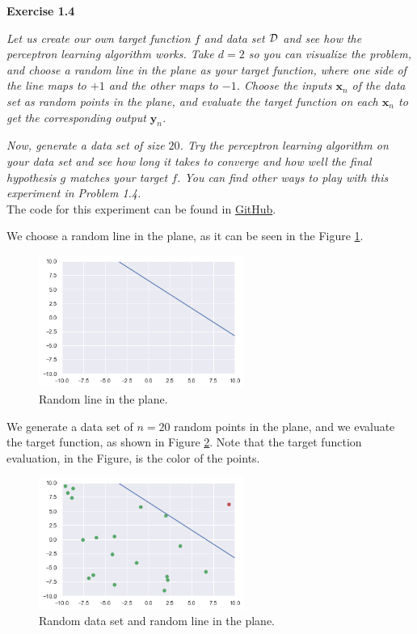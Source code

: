 \documentclass{article}
\begin{document}
    \bigskip

    \noindent \textbf{Exercise 1.4}

    \noindent \textit{Let us create our own target function $f$ and data set $\cal{D}$ and see how the perceptron learning algorithm works.
    Take $d = 2$ so you can visualize the problem, and choose a random line in the plane as your target function, where one side of the line maps to $+1$ and the other maps to $-1$.
    Choose the inputs $\mathbf{x}_n$ of the data set as random points in the plane, and evaluate the target function on each $\mathbf{x}_n$ to get the corresponding output $\mathbf{y}_n$.}

    \noindent\textit{Now, generate a data set of size $20$. Try the perceptron learning algorithm on your data set and see how long it takes to converge and how well the final hypothesis $g$ matches your target $f$.
    You can find other ways to play with this experiment in Problem 1.4.} \\

    The code for this experiment can be found in \href{https://github.com/lucasresck/machine-learning/blob/main/notebooks/exercise_1.4.ipynb}{GitHub}.

    We choose a random line in the plane, as it can be seen in the Figure \ref{fig:random_line}.
    
    \begin{figure}[H]
        \centering
        \includegraphics[width=0.6\textwidth]{exercise_1.4_1.png}
        \caption{Random line in the plane.}
        \label{fig:random_line}
    \end{figure}

    We generate a data set of $n = 20$ random points in the plane, and we evaluate the target function, as shown in Figure \ref{fig:data_set}.
    Note that the target function evaluation, in the Figure, is the color of the points.
    
    \begin{figure}[H]
        \centering
        \includegraphics[width=0.6\textwidth]{exercise_1.4_2.png}
        \caption{Random data set and random line in the plane.}
        \label{fig:data_set}
    \end{figure}
\end{document}
